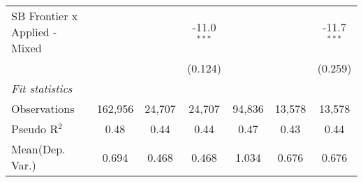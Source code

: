 \begin{tabular}{lcccccc}
   SB Frontier x Applied - Mixed &               &             & -11.0$^{***}$  &               &              & -11.7$^{***}$\\   
                                 &               &             & (0.124)        &               &              & (0.259)\\   
   \midrule
   \emph{Fit statistics}\\
   Observations                  & 162,956       & 24,707      & 24,707         & 94,836        & 13,578       & 13,578\\  
   Pseudo R$^2$                  & 0.48          & 0.44        & 0.44           & 0.47          & 0.43         & 0.44\\  
Mean(Dep. Var.) & 0.694 & 0.468 & 0.468 & 1.034 & 0.676 & 0.676 \\
   

\end{tabular}
